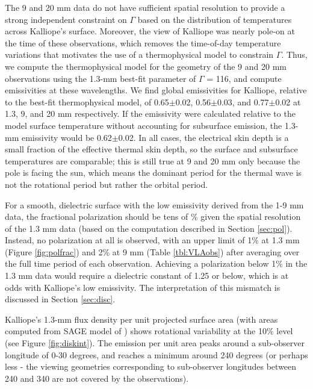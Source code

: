 \documentclass[]{aastex631}
\begin{document}
The 9 and 20 mm data do not have sufficient spatial resolution to provide a strong independent constraint on $\Gamma$ based on the distribution of temperatures across Kalliope's surface. Moreover, the view of Kalliope was nearly pole-on at the time of these observations, which removes the time-of-day temperature variations that motivates the use of a thermophysical model to constrain $\Gamma$. Thus, we compute the thermophysical model for the geometry of the 9 and 20 mm observations using the 1.3-mm best-fit parameter of $\Gamma$ = 116, and compute emissivities at these wavelengths. We find global emissivities for Kalliope, relative to the best-fit thermophysical model, of 0.65$\pm$0.02, 0.56$\pm$0.03, and 0.77$\pm$0.02 at 1.3, 9, and 20 mm respectively. If the emissivity were calculated relative to the model surface temperature without accounting for subsurface emission, the 1.3-mm emissivity would be 0.62$\pm$0.02. In all cases, the electrical skin depth is a small fraction of the effective thermal skin depth, so the surface and subsurface temperatures are comparable; this is still true at 9 and 20 mm only because the pole is facing the sun, which means the dominant period for the thermal wave is not the rotational period but rather the orbital period.

For a smooth, dielectric surface with the low emissivity derived from the 1-9 mm data, the fractional polarization should be tens of \% given the spatial resolution of the 1.3 mm data (based on the computation described in Section \ref{sec:pol}). Instead, no polarization at all is observed, with an upper limit of 1\% at 1.3 mm (Figure \ref{fig:polfrac}) and 2\% at 9 mm (Table \ref{tbl:VLAobs}) after averaging over the full time period of each observation. Achieving a polarization below 1\% in the 1.3 mm data would require a dielectric constant of 1.25 or below, which is at odds with Kalliope's low emissivity. The interpretation of this mismatch is discussed in Section \ref{sec:disc}.

Kalliope's 1.3-mm flux density per unit projected surface area (with areas computed from SAGE model of \cite{ferrais2022}) shows rotational variability at the 10\% level (see Figure \ref{fig:diskint}). The emission per unit area peaks around a sub-observer longitude of 0-30 degrees, and reaches a minimum around 240 degrees (or perhaps less - the viewing geometries corresponding to sub-observer longitudes between 240 and 340 are not covered by the observations).
\end{document}
